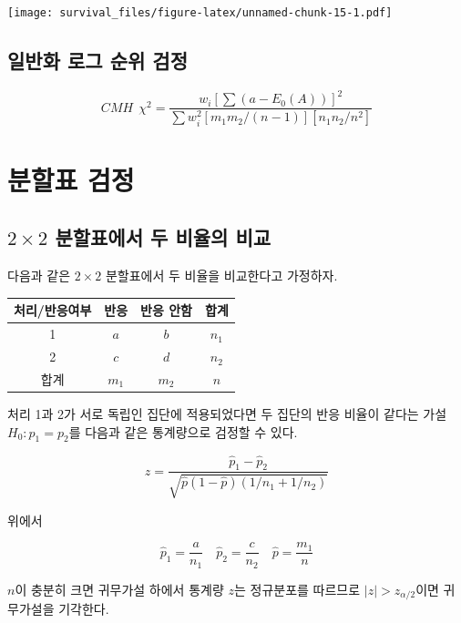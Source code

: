 \documentclass[
]{book}
\theoremstyle{definition}
\theoremstyle{definition}
\theoremstyle{definition}
\theoremstyle{definition}
\theoremstyle{remark}
\begin{document}
\texttt{[image: survival\_files/figure-latex/unnamed-chunk-15-1.pdf]}

\hypertarget{uxc77cuxbc18uxd654-uxb85cuxadf8-uxc21cuxc704-uxac80uxc815}{%
\section{일반화 로그 순위 검정}\label{uxc77cuxbc18uxd654-uxb85cuxadf8-uxc21cuxc704-uxac80uxc815}}

\[ CMH ~~\chi^2 = \frac {w_i[ \sum (a-E_0(A))]^2}{ \sum w_i^2 [m_1 m_2/(n-1)][n_1 n_2 /n^2] }  \]

\hypertarget{appendix-appendix}{%
\appendix {}}


\hypertarget{uxbd84uxd560uxd45c-uxac80uxc815}{%
\chapter{분할표 검정}\label{uxbd84uxd560uxd45c-uxac80uxc815}}

\hypertarget{times-2-uxbd84uxd560uxd45cuxc5d0uxc11c-uxb450-uxbe44uxc728uxc758-uxbe44uxad50}{%
\section{\texorpdfstring{\(2 \times 2\) 분할표에서 두 비율의 비교}{2 \textbackslash times 2 분할표에서 두 비율의 비교}}\label{times-2-uxbd84uxd560uxd45cuxc5d0uxc11c-uxb450-uxbe44uxc728uxc758-uxbe44uxad50}}

다음과 같은 \(2 \times 2\) 분할표에서 두 비율을 비교한다고 가정하자.

\begin{longtable}[]{@{}cccc@{}}
\toprule
처리/반응여부 & 반응 & 반응 안함 & 합계\tabularnewline
\midrule
\endhead
1 & \(a\) & \(b\) & \(n_1\)\tabularnewline
2 & \(c\) & \(d\) & \(n_2\)\tabularnewline
합계 & \(m_1\) & \(m_2\) & \(n\)\tabularnewline
\bottomrule
\end{longtable}

처리 1과 2가 서로 독립인 집단에 적용되었다면 두 집단의 반응 비율이 같다는 가설 \(H_0: p_1=p_2\)를 다음과 같은 통계량으로 검정할 수 있다.

\[ z = \frac{ \hat p_1 - \hat p_2} { \sqrt{\hat p (1-\hat p) (1/n_1 + 1/n_2)}} \]

위에서

\[ \hat p_1 = \frac{a}{n_1} \quad \hat p_2 = \frac{c}{n_2} \quad \hat p = \frac{m_1}{n} \]

\(n\)이 충분히 크면 귀무가설 하에서 통계량 \(z\)는 정규분포를 따르므로 \(|z|>z_{\alpha/2}\)이면 귀무가설을 기각한다.
\end{document}
